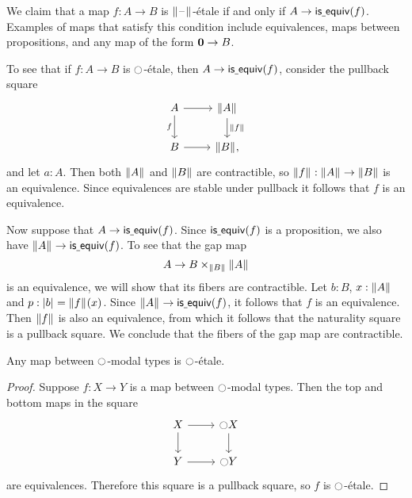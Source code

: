 \begin{eg}\label{eg:etale_prop}
We claim that a map $f:A\to B$ is $\Vert \mathord{\hspace{1pt}\text{--}\hspace{1pt}}\Vert_{}$-\'etale if and only if $A\to \mathsf{is\underline{\ }{}equiv}(f)$. Examples of maps that satisfy this condition include equivalences, maps between propositions, and any map of the form $\mathbf{0}\to B$.

To see that if $f:A\to B$ is ${\ocircle}$-\'etale, then $A\to\mathsf{is\underline{\ }{}equiv}(f)$, consider the pullback square
\begin{equation*}
\begin{tikzcd}
A \arrow[r] \arrow[d,swap,"f"] & \brck{A} \arrow[d,"\brck{f}"] \\
B \arrow[r] & \brck{B},
\end{tikzcd}
\end{equation*}
and let $a:A$. Then both $\Vert A\Vert_{}$ and $\Vert B\Vert_{}$ are contractible, so $\Vert f\Vert_{}:\Vert A\Vert_{}\to\Vert B\Vert_{}$ is an equivalence. Since equivalences are stable under pullback it follows that $f$ is an equivalence.

Now suppose that $A\to \mathsf{is\underline{\ }{}equiv}(f)$. Since $\mathsf{is\underline{\ }{}equiv}(f)$ is a proposition, we also have $\Vert A\Vert_{}\to\mathsf{is\underline{\ }{}equiv}(f)$. To see that the gap map
\begin{equation*}
A \to B\times_{\Vert B\Vert_{}}\Vert A\Vert_{}
\end{equation*}
is an equivalence, we will show that its fibers are contractible. Let $b:B$, $x:\Vert A\Vert_{}$ and $p:\mathopen{}\left|b\right|_{}^{}\mathclose{}=\Vert f\Vert_{}(x)$. Since $\Vert A\Vert_{}\to\mathsf{is\underline{\ }{}equiv}(f)$, it follows that $f$ is an equivalence. Then $\Vert f\Vert_{}$ is also an equivalence, from which it follows that the naturality square is a pullback square. We conclude that the fibers of the gap map are contractible. 
\end{eg}

\begin{lem}\label{lem:etale_modal}
Any map between ${\ocircle}$-modal types is ${\ocircle}$-\'etale.
\end{lem}

\begin{proof}
Suppose $f:X\to Y$ is a map between ${\ocircle}$-modal types. Then the top and bottom maps in the square
\begin{equation*}
\begin{tikzcd}
X \arrow[r] \arrow[d] & \modal X \arrow[d] \\
Y \arrow[r] & \modal Y
\end{tikzcd}
\end{equation*}
are equivalences. Therefore this square is a pullback square, so $f$ is ${\ocircle}$-\'etale.
\end{proof}

